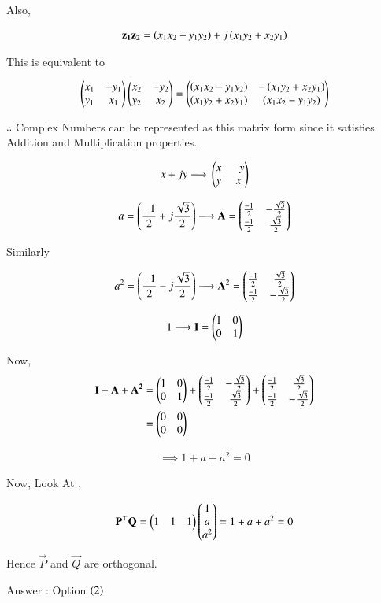 \documentclass[journal]{IEEEtran}
\numberwithin{equation}{enumi}
\numberwithin{figure}{enumi}
\begin{document}
Also, 

\begin{align}
    \mathbf{z_1}\mathbf{z_2} = \left(x_1x_2 - y_1y_2\right) + j\left(x_1y_2 + x_2y_1\right)
\end{align}

This is equivalent to 

\begin{align}
    \begin{pmatrix}x_1 & -y_1 \\ y_1 & x_1\end{pmatrix}\begin{pmatrix}x_2 & -y_2 \\ y_2 & x_2 \end{pmatrix} = \begin{pmatrix}\left(x_1x_2 - y_1y_2\right) & -\left(x_1y_2 + x_2y_1\right) \\ \left(x_1y_2 + x_2y_1\right) & \left(x_1x_2 - y_1y_2\right)\end{pmatrix}
\end{align}

$\therefore$ Complex Numbers can be represented as this matrix form since it satisfies Addition and Multiplication properties. 
 
\begin{align}
    x+jy \longrightarrow{} \begin{pmatrix}x & -y \\ y & x \end{pmatrix}
\end{align}

\begin{align}
    a = \left(\frac{-1}{2} + j\frac{\sqrt{3}}{2}\right) \longrightarrow \mathbf{A} = \begin{pmatrix}\frac{-1}{2}&-\frac{\sqrt{3}}{2}\\\frac{-1}{2} & \frac{\sqrt{3}}{2}\end{pmatrix}
\end{align}

Similarly 

\begin{align}
    a^2 = \left(\frac{-1}{2} - j\frac{\sqrt{3}}{2}\right) \longrightarrow \mathbf{A}^2 = \begin{pmatrix}\frac{-1}{2}&\frac{\sqrt{3}}{2}\\\frac{-1}{2} & -\frac{\sqrt{3}}{2}\end{pmatrix}
\end{align}

\begin{align}
    1 \longrightarrow \mathbf{I} = \begin{pmatrix}1&0\\0&1\end{pmatrix}
\end{align}

Now, 
\begin{align}
    \mathbf{I} + \mathbf{A} + \mathbf{A^2} &= \begin{pmatrix}1&0\\0&1\end{pmatrix} + \begin{pmatrix}\frac{-1}{2}&-\frac{\sqrt{3}}{2}\\\frac{-1}{2} & \frac{\sqrt{3}}{2}\end{pmatrix} + \begin{pmatrix}\frac{-1}{2}&\frac{\sqrt{3}}{2}\\\frac{-1}{2} & -\frac{\sqrt{3}}{2}\end{pmatrix}\\ 
    &= \begin{pmatrix}0&0\\0&0\end{pmatrix}
\end{align}

\begin{align}
    \implies 1 + a + a^2 = 0 
\end{align}

Now, Look At , 

\begin{align}
    \mathbf{P}^{\top}\mathbf{Q} = \begin{pmatrix}1&1&1\end{pmatrix}\begin{pmatrix}1\\a\\a^2\end{pmatrix} = 1 + a + a^2 = 0 
\end{align}

Hence $\vec{P}$ and $\vec{Q}$ are orthogonal. 

Answer  : Option $\left(2\right)$
\end{document}
